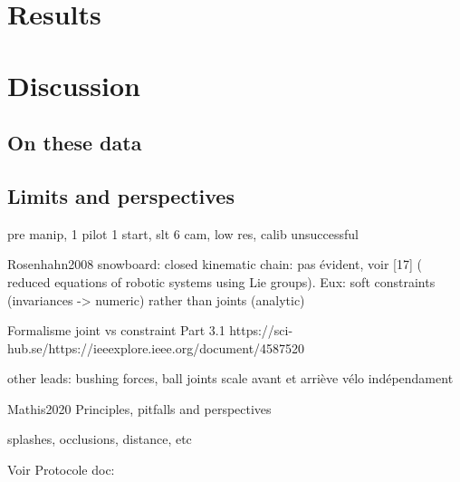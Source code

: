 


\section{Results}



\section{Discussion}
\subsection{On these data}


\subsection{Limits and perspectives}

pre manip, 1 pilot 1 start, slt 6 cam, low res, calib unsuccessful

Rosenhahn2008 snowboard: closed kinematic chain: pas évident, voir [17] ( reduced equations of robotic systems using Lie groups). Eux: soft constraints (invariances -> numeric) rather than joints (analytic)

Formalisme joint vs constraint Part 3.1 https://sci-hub.se/https://ieeexplore.ieee.org/document/4587520

other leads: bushing forces, ball joints
scale avant et arriève vélo indépendament





Mathis2020 Principles, pitfalls and perspectives

splashes, occlusions, distance, etc

Voir Protocole doc: %
